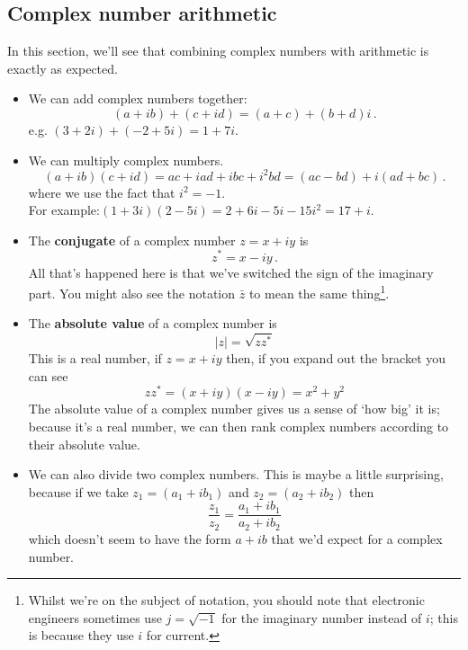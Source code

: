 \documentclass[12pt]{article}
\begin{document}
\subsection*{Complex number arithmetic}
In this section, we'll see that combining complex numbers with arithmetic is exactly as expected.

\begin{itemize}
    \item We can add complex numbers together:
\begin{equation}
  (a+ib)+(c+id)=(a+c)+(b+d)i\,.
\end{equation}
e.g. $(3+2i)+ (-2+5i) = 1+7i$. 

\item We can multiply complex numbers.
\begin{equation}
  (a+ib)(c+id)=ac +iad + ibc + i^2bd = (ac-bd)+i(ad+bc)\,.
\end{equation}
where we use the fact that $i^2 = -1$.\\
For example:$
  (1+3i)(2-5i)=2+6i-5i-15i^2=17+i
$.

\item The \textbf{conjugate} of a complex number $z = x+iy$ is 
\begin{equation}
  z^*=x-iy\,.
\end{equation}
All that's happened here is that we've switched the sign of the imaginary part. You might also see the notation $\bar{z}$ to mean the same thing\footnote{Whilst we're on the subject of notation, you should note that electronic engineers sometimes use $j=\sqrt{-1}$ for the imaginary number instead of $i$; this is because they use $i$ for current.}.

\item The \textbf{absolute value} of a complex number is
\begin{equation}
  |z|=\sqrt{zz^{*}}
\end{equation}
This is a real number, if $z=x+iy$ then, if you expand out the bracket
you can see
\begin{equation}
  zz^*=(x+iy)(x-iy)=x^2+y^2
\end{equation}
The absolute value of a complex number gives us a sense of `how big' it is; because it's a real number, we can then rank complex numbers according to their absolute value. 

\item We can also divide two complex numbers. This is maybe a little surprising, because if we take $z_1 = (a_1+ib_1)$ and $z_2 = (a_2 + ib_2)$
then 
\begin{equation}
  \frac{z_1}{z_2}=\frac{a_1 + ib_1}{a_2 + ib_2}
\end{equation}
which doesn't seem to have the form $a+ib$ that we'd expect for a complex number. 


\end{itemize}
\end{document}
